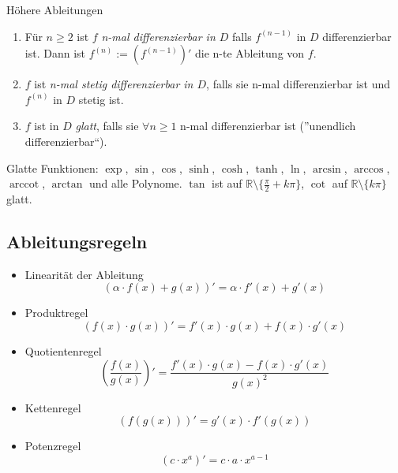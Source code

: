 \documentclass[a4paper,10pt]{article}
\def\R{\mathbb{R}}
\DeclareMathOperator{\arccot}{arccot}
\begin{document}
\begin{mainbox}{Höhere Ableitungen}
 \begin{enumerate}
  \item Für $n \ge 2$ ist $f$ \emph{n-mal differenzierbar in $D$} falls $f^{(n-1)}$ in $D$ differenzierbar ist. Dann ist $f^{(n)} := (f^{(n-1)})'$ die n-te Ableitung von $f$.
  \item $f$ ist \emph{n-mal stetig differenzierbar in $D$}, falls sie n-mal differenzierbar ist und $f^{(n)}$ in $D$ stetig ist.
  \item $f$ ist in $D$ \emph{glatt}, falls sie $\forall n \ge 1$ n-mal differenzierbar ist (''unendlich differenzierbar``).
 \end{enumerate}
\end{mainbox}
Glatte Funktionen: $\exp$, $\sin$, $\cos$, $\sinh$, $\cosh$, $\tanh$, $\ln$, $ \arcsin$, $\arccos$, $\arccot$, $\arctan$ und alle Polynome. $\tan$ ist auf $\R \setminus \{\frac{\pi}{2} + k\pi\}$, $\cot$ auf $\R \setminus \{k\pi\}$ glatt.

\subsection{Ableitungsregeln}

\begin{itemize}
  \item Linearität der Ableitung
  $$(\alpha \cdot f(x) + g(x))' = \alpha \cdot f'(x) + g'(x)$$
  \item Produktregel
  $$(f(x) \cdot g(x))' = f'(x) \cdot g(x) + f(x) \cdot g'(x)$$
  \item Quotientenregel
  $$\left(\frac{f(x)}{g(x)}\right)' = \frac{f'(x) \cdot g(x) - f(x) \cdot g'(x)}{g(x)^2}$$
  \item Kettenregel
  $$(f(g(x)))' = g'(x) \cdot f'(g(x))$$
  \item Potenzregel
  $$(c \cdot x^a)' = c \cdot a \cdot x^{a - 1}$$
\end{itemize}
\end{document}

